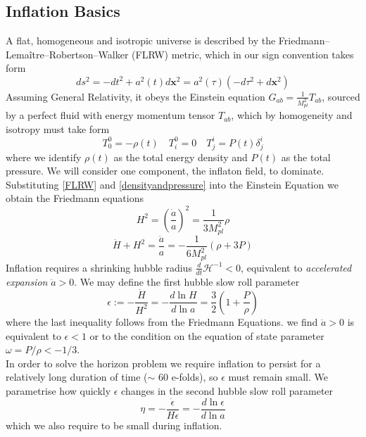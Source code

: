 \documentclass[a4paper,10pt]{article}
\renewcommand{\v}[1]{\mathbf{#1}}
\newcommand{\Mp}{M_{pl}}
\begin{document}
\subsection{Inflation Basics}
A flat, homogeneous and isotropic universe is described by the Friedmann–Lemaître–Robertson–Walker (FLRW) metric, which in our sign convention takes form
\begin{equation}
\label{FLRW}
ds^2 = - dt^2 + a^2(t)d\v{x}^2 = a^2(\tau)(-d\tau^2+d\v{x}^2)
\end{equation}
Assuming General Relativity, it obeys the Einstein equation $G_{ab} = \frac{1}{\Mp^2} T_{ab}$, sourced by a perfect fluid with energy momentum tensor $T_{ab}$, which by homogeneity and isotropy must take form
\begin{equation}
\label{densityandpressure}
T^0_0 = - \rho(t) \quad T^0_i = 0 \quad T^i_j = P(t)\delta^i_j
\end{equation}
where we  identify $\rho(t)$ as the total energy density and $P(t)$ as the total pressure. We will consider one component, the inflaton field, to dominate.  Substituting \ref{FLRW} and \ref{densityandpressure} into the Einstein Equation we obtain the Friedmann equations
\begin{equation}
H^2 = \left(\frac{\dot{a}}{a}\right)^2 = \frac{1}{3\Mp^2}\rho
\tag{F1}
\label{F1}
\end{equation}
\begin{equation}
\dot{H} + H^2 = \frac{\ddot{a}}{a} = -\frac{1}{6\Mp^2}(\rho + 3P)
\tag{F2}
\label{F2}
\end{equation}
Inflation requires a shrinking hubble radius $\frac{d}{dt}\mathcal{H}^{-1}<0$, equivalent to \textit{accelerated expansion} $\ddot{a} >0$. We may define the first hubble slow roll parameter 
\begin{equation}
\label{epsilon}
\epsilon := -\frac{\dot{H}}{H^2} = -\frac{d\ln{H}}{d\ln{a}} = \frac{3}{2}\left(1+\frac{P}{\rho}\right)
\end{equation}
where the last inequality follows from the Friedmann Equations. we find $\ddot{a} >0$ is equivalent to $\epsilon<1$ or to the condition on the equation of state parameter $\omega=P/\rho < -1/3$.\\ 
In order to solve the horizon problem we require inflation to persist for a relatively long duration of time ($\sim$ 60 e-folds), so $\epsilon$ must remain small. We parametrise how quickly $\epsilon$ changes in the second hubble slow roll parameter 
\begin{equation}
\eta = -\frac{\dot{\epsilon}}{H\epsilon} = -\frac{d\ln{\epsilon}}{d\ln{a}}
\end{equation}
which we also require to be small during inflation.
\end{document}
